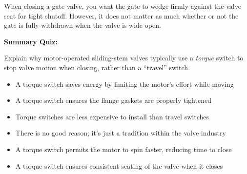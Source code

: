 





When closing a gate valve, you want the gate to wedge firmly against the valve seat for tight shutoff.  However, it does not matter as much whether or not the gate is fully withdrawn when the valve is wide open.
 






\vfil \eject

\noindent
{\bf Summary Quiz:}

Explain why motor-operated sliding-stem valves typically use a {\it torque} switch to stop valve motion when closing, rather than a ``travel'' switch.

\begin{itemize}
\item{} A torque switch saves energy by limiting the motor's effort while moving
\vskip 5pt 
\item{} A torque switch ensures the flange gaskets are properly tightened 
\vskip 5pt 
\item{} Torque switches are less expensive to install than travel switches
\vskip 5pt 
\item{} There is no good reason; it's just a tradition within the valve industry
\vskip 5pt 
\item{} A torque switch permits the motor to spin faster, reducing time to close
\vskip 5pt 
\item{} A torque switch ensures consistent seating of the valve when it closes
\end{itemize}






